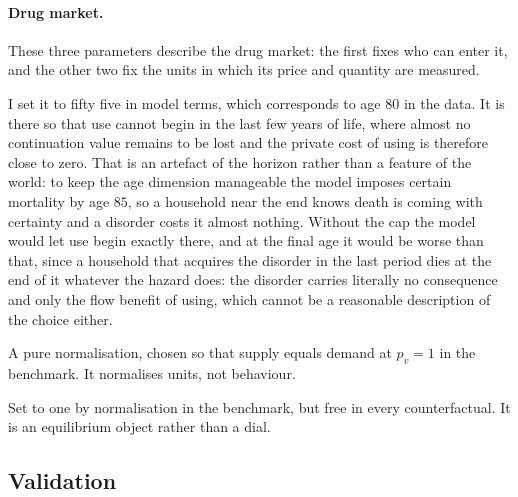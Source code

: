 \documentclass[10pt]{article}
\begin{document}
\paragraph{Drug market.} These three parameters describe the drug market: the first
fixes who can enter it, and the other two fix the units in which its price and
quantity are measured.
\begin{description}\setlength{\itemsep}{0.25em}\setlength{\parskip}{0em}
\item[$J_E$, the maximum age at which use can begin.] I set it to fifty five in model terms, which corresponds to age $80$ in the data.
It is there so that use cannot begin in the last few years of life, where almost no
continuation value remains to be lost and the private cost of using is therefore
close to zero. That is an artefact of the horizon rather than a feature of the world:
to keep the age dimension manageable the model imposes certain mortality by age $85$,
so a household near the end knows death is coming with certainty and a disorder costs
it almost nothing. Without the cap the model would let use begin exactly there, and
at the final age it would be worse than that, since a household that acquires the
disorder in the last period dies at the end of it whatever the hazard does: the
disorder carries literally no consequence and only the flow benefit of using, which
cannot be a reasonable description of the choice either.

\item[$\nu_1$, the supply shifter.] A pure normalisation, chosen so that supply
equals demand at $p_v=1$ in the benchmark. It normalises units, not behaviour.

\item[$p_v$, the drug price.] Set to one by normalisation in the benchmark, but
free in every counterfactual. It is an equilibrium object rather than a dial.

\end{description}


\subsection{Validation}\label{sec:fvalid}
\end{document}
